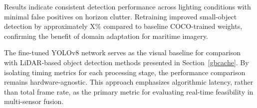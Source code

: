 \documentclass[../main.tex]{subfiles}
\begin{document}

Results indicate consistent detection performance across lighting conditions with minimal false positives on horizon clutter.
Retraining improved small-object detection by approximately X\% compared to baseline COCO-trained weights, confirming the benefit of domain adaptation for maritime imagery.


The fine-tuned YOLOv8 network serves as the visual baseline for comparison with LiDAR-based object detection methods presented in Section~\ref{gbcache}.
By isolating timing metrics for each processing stage, the performance comparison remains hardware-agnostic.
This approach emphasizes algorithmic latency, rather than total frame rate, as the primary metric for evaluating real-time feasibility in multi-sensor fusion.
\end{document}
